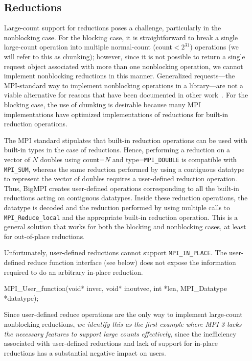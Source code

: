 
\subsection{Reductions}
\label{sec:reductions}

Large-count support for reductions poses a challenge, particularly in the nonblocking case.
For the blocking case, it is straightforward to break a single large-count operation into
multiple normal-count (count$<2^{31}$) operations (we will refer to this as chunking); 
however, since it is not possible to return a single request object associated with more than 
one nonblocking operation, we cannot implement nonblocking reductions in this manner.
Generalized requests---the MPI-standard way to implement nonblocking operations 
in a library---are not a viable alternative for reasons that have been documented 
in other work~\cite{latham:grequest-extensions}.
For the blocking case, the use of chunking is desirable because many MPI implementations 
have optimized implementations of reductions for built-in reduction operations.

The MPI standard stipulates that built-in reduction operations can be used with built-in types
in the case of reductions. Hence, performing a reduction on a vector of $N$
doubles using count=$N$ and type=\texttt{MPI\_DOUBLE} is compatible with \texttt{MPI\_SUM},
whereas the same reduction performed by using a contiguous datatype to represent the vector
of doubles requires a user-defined reduction operation.
Thus, BigMPI creates user-defined operations corresponding to all the built-in reductions
acting on contiguous datatypes.  Inside these reduction operations, the datatype is
decoded and the reduction performed by using multiple calls to \texttt{MPI\_Reduce\_local}
and the appropriate built-in reduction operation.
This is a general solution that works for both the blocking and nonblocking cases,
at least for out-of-place reductions.

Unfortunately, user-defined reductions cannot support \texttt{MPI\_IN\_PLACE}.
The user-defined reduce function interface (see below) does not expose
the information required to do an arbitrary in-place reduction.
\begin{code}
MPI_User_function(void* invec, void* inoutvec, 
                  int *len, MPI_Datatype *datatype);
\end{code}
Since user-defined reduce operations are the only way to implement
large-count nonblocking reductions, \textit{we identify this as the first example
where MPI-3 lacks the necessary features to support large counts effectively,}
since the inefficiency associated with user-defined reductions and lack of support
for in-place reductions has a substantial negative impact on users.
